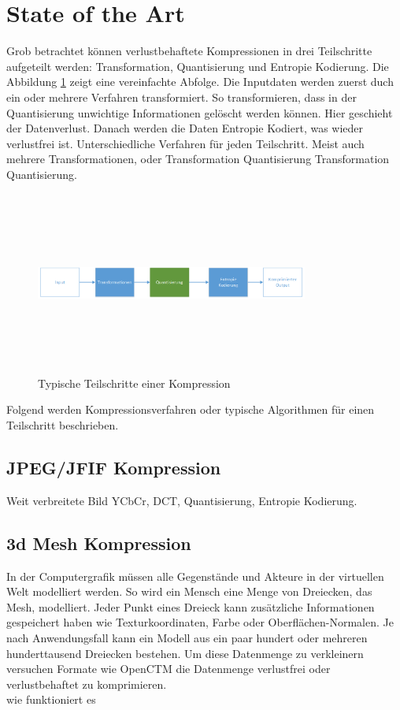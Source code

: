 \section{State of the Art}
Grob betrachtet können verlustbehaftete Kompressionen in drei Teilschritte aufgeteilt werden: Transformation, Quantisierung und Entropie Kodierung. Die Abbildung \ref{state:aufbau} zeigt eine vereinfachte Abfolge. Die Inputdaten werden zuerst duch ein oder mehrere Verfahren transformiert. So transformieren, dass in der Quantisierung unwichtige Informationen gelöscht werden können. Hier geschieht der Datenverlust. Danach werden die Daten Entropie Kodiert, was wieder verlustfrei ist. Unterschiedliche Verfahren für jeden Teilschritt. Meist auch mehrere Transformationen, oder Transformation Quantisierung Transformation Quantisierung.\\
\begin{figure}[!htbp]
	\center
	\includegraphics[width=0.8\textwidth,height=6cm,keepaspectratio]{./pictures/state/aufbau.png}
	\caption{Typische Teilschritte einer Kompression}
	\label{state:aufbau}
\end{figure}
Folgend werden Kompressionsverfahren oder typische Algorithmen für einen Teilschritt beschrieben.

\subsection{JPEG/JFIF Kompression}
Weit verbreitete Bild
YCbCr, DCT, Quantisierung, Entropie Kodierung.

\subsection{3d Mesh Kompression}
In der Computergrafik müssen alle Gegenstände und Akteure in der virtuellen Welt modelliert werden. So wird ein Mensch eine Menge von Dreiecken, das Mesh, modelliert. Jeder Punkt eines Dreieck kann zusätzliche Informationen gespeichert haben wie Texturkoordinaten, Farbe oder Oberflächen-Normalen. Je nach Anwendungsfall kann ein Modell aus ein paar hundert oder mehreren hunderttausend Dreiecken bestehen. Um diese Datenmenge zu verkleinern versuchen Formate wie OpenCTM \cite{website:openctm} die Datenmenge verlustfrei oder verlustbehaftet zu komprimieren.\\
wie funktioniert es\\

